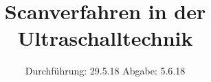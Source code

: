 

\subject{US2}
\title{Scanverfahren in der Ultraschalltechnik}
\date{%
  Durchführung: 29.5.18
  \hspace{3em}
  Abgabe: 5.6.18
}



\maketitle
\thispagestyle{empty}
\tableofcontents
\newpage






\printbibliography{}


